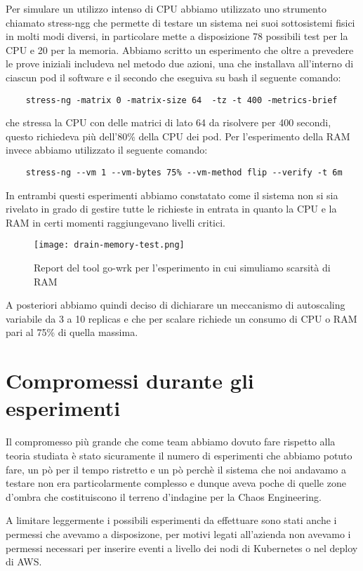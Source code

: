 Per simulare un utilizzo intenso di CPU abbiamo utilizzato uno strumento chiamato \gls{stress-ngg} che permette di testare un sistema nei suoi sottosistemi fisici in molti modi diversi, in particolare mette a disposizione 78 possibili test per la CPU e 20 per la memoria.
Abbiamo scritto un esperimento che oltre a prevedere le prove iniziali includeva nel metodo due azioni, una che installava all'interno di ciascun pod il software e il secondo che eseguiva su bash il seguente comando:
\begin{verbatim}
    stress-ng -matrix 0 -matrix-size 64  -tz -t 400 -metrics-brief
\end{verbatim}
che stressa la CPU con delle matrici di lato 64 da risolvere per 400 secondi, questo richiedeva più dell'80\% della CPU dei pod.
Per l'esperimento della RAM invece abbiamo utilizzato il seguente comando:
\begin{verbatim}
    stress-ng --vm 1 --vm-bytes 75% --vm-method flip --verify -t 6m
\end{verbatim}

In entrambi questi esperimenti abbiamo constatato come il sistema non si sia rivelato in grado di gestire tutte le richieste in entrata in quanto la CPU e la RAM in certi momenti raggiungevano livelli critici.
\begin{figure}[h]
    \centering
    \texttt{[image: drain-memory-test.png]}
    \caption{Report del tool go-wrk per l'esperimento in cui simuliamo scarsità di RAM}
    \label{tab:report-drain-ram}
\end{figure}
A posteriori abbiamo quindi deciso di dichiarare un meccanismo di autoscaling variabile da 3 a 10 replicas e che per scalare richiede un consumo di CPU o RAM pari al 75\% di quella massima.

\section{Compromessi durante gli esperimenti}
Il compromesso più grande che come team abbiamo dovuto fare rispetto alla teoria studiata è stato sicuramente il numero di esperimenti che abbiamo potuto fare, un pò per il tempo ristretto e un pò perchè il sistema che noi andavamo a testare non era particolarmente complesso e dunque aveva poche di quelle zone d'ombra che costituiscono il terreno d'indagine per la Chaos Engineering.

A limitare leggermente i possibili esperimenti da effettuare sono stati anche i permessi che avevamo a disposizone, per motivi legati all'azienda non avevamo i permessi necessari per inserire eventi a livello dei nodi di Kubernetes o nel deploy di AWS.


